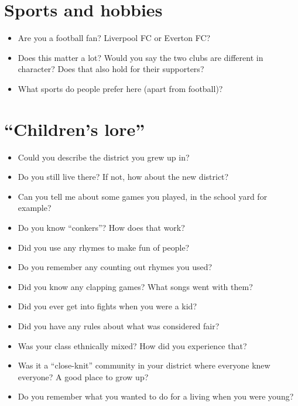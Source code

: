 	\section*{Sports and hobbies}
	\begin{multicols}{2}
		\begin{itemize}
			\item Are you a football fan? Liverpool FC or Everton FC?
			\item Does this matter a lot? Would you say the two clubs are different in character? Does that also hold for their supporters?
			\item What sports do people prefer here (apart from football)?
		\end{itemize}
	\end{multicols}
	
	\section*{``Children’s lore''}
	\begin{multicols}{2}
		\begin{itemize}
			\item Could you describe the district you grew up in?
			\item Do you still live there? If not, how about the new district?
			\item Can you tell me about some games you played, in the school yard for example?
			\item Do you know ``conkers''? How does that work?
			\item Did you use any rhymes to make fun of people?
			\item Do you remember any counting out rhymes you used?
			\item Did you know any clapping games? What songs went with them?
			\item Did you ever get into fights when you were a kid?
			\item Did you have any rules about what was considered fair?
			\item Was your class ethnically mixed? How did you experience that?
			\item Was it a ``close-knit'' community in your district where everyone knew everyone? A good place to grow up?
			\item Do you remember what you wanted to do for a living when you were young?
		\end{itemize}
	\end{multicols}
	
